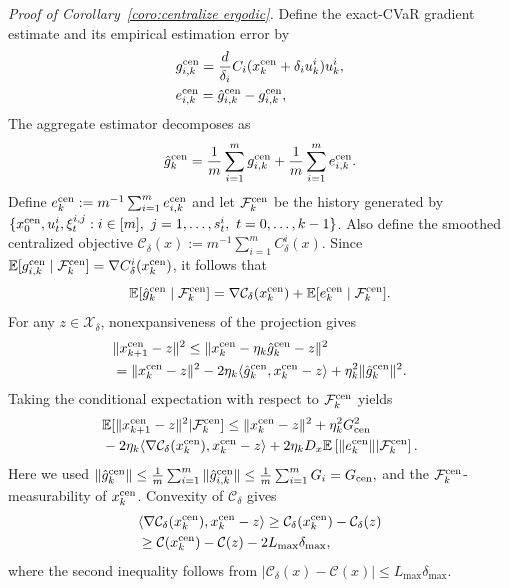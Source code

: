 \documentclass[twocolumn]{autart}    %
\newcommand{\brk}[1]{\left[#1\right]}
\newcommand{\1}{\mathbf{1}}
\begin{document}
\textit{Proof of Corollary~\ref{coro:centralize ergodic}.}
Define the exact-CVaR gradient estimate and its empirical estimation error by
\begin{align*}
&g_{i,k}^{\rm cen} = \frac{d}{\delta_{i}} C_{i}(x_k^{\rm cen} + \delta_{i} u_{k}^{i}) u_{k}^{i}, \nonumber \\ 
&e_{i,k}^{\rm cen} = \hat{g}_{i,k}^{\rm cen} - g_{i,k}^{\rm cen},
\end{align*}
The aggregate estimator decomposes as
$$\hat{g}_k^{\rm cen} = \frac{1}{m} \sum_{i=1}^{m} g_{i,k}^{\rm cen} + \frac{1}{m} \sum_{i=1}^{m} e_{i,k}^{\rm cen}.$$ 
Define $e_k^{\rm cen}:=m^{-1}\sum_{i=1}^m e_{i,k}^{\rm cen}$ and let $\mathcal F_k^{\rm cen}$ be the history generated by $\{x_0^{\rm cen},u_t^i,\xi_t^{i,j}:i\in[m],\ j=1,\ldots,s_t^i,\ t=0,\ldots,k-1\}$. Also define the smoothed centralized objective $\mathcal C_\delta(x):=m^{-1}\sum_{i=1}^mC_\delta^i(x)$.
Since
$\mathbb{E}[g_{i,k}^{\rm cen} \mid \mathcal{F}_{k}^{\rm cen}] = \nabla C_\delta^i(x_k^{\rm cen})$, it follows that
\begin{equation*}
\mathbb{E}[\hat{g}_k^{\rm cen} \mid \mathcal{F}_{k}^{\rm cen}] = \nabla \mathcal{C}_\delta(x_k^{\rm cen}) + \mathbb{E}[e_k^{\rm cen} \mid \mathcal{F}_{k}^{\rm cen}]   .
\end{equation*}
For any $z\in\mathcal X_\delta$, nonexpansiveness of the projection gives
\begin{align*}
&\|x_{k+1}^{\rm cen} - z\|^{2} \le \|x_k^{\rm cen} - \eta_{k} \hat{g}_k^{\rm cen} - z\|^{2} \\ 
&= \|x_k^{\rm cen} - z\|^{2} - 2\eta_{k} \langle \hat{g}_k^{\rm cen}, x_k^{\rm cen} - z \rangle + \eta_{k}^{2} \|\hat{g}_k^{\rm cen}\|^{2} .
\end{align*} 
Taking the conditional expectation with respect to $\mathcal F_k^{\rm cen}$ yields
\begin{align}\label{eq:centralize one-step}
&\mathbb{E}[\|x_{k+1}^{\rm cen} - z\|^{2} | \mathcal{F}_{k}^{\rm cen}] \le \|x_k^{\rm cen} - z\|^{2}  + \eta_{k}^{2} G_{\text{cen}}^{2} \nonumber \\ 
&- 2\eta_{k} \langle \nabla \mathcal{C}_\delta(x_k^{\rm cen}), x_k^{\rm cen} - z \rangle+ 2\eta_{k} D_{x}  \mathbb{E}\brk{\|e_k^{\rm cen}\|  |\mathcal{F}_{k}^{\rm cen}}. 
\end{align}
 Here we used 
$\|\hat{g}_{k}^{\rm cen}\| \le \frac{1}{m}\sum_{i=1}^m \|\hat{g}_{i,k}^{\rm cen}\| \le  \frac{1}{m}\sum_{i=1}^m  G_{i} = G_{\rm cen},$
and the $\mathcal F_k^{\rm cen}$-measurability of $x_k^{\rm cen}$.
Convexity of $\mathcal C_\delta$ gives
\begin{align}\label{eq:centralize CVaR deviation}
&\langle \nabla \mathcal{C}_\delta(x_k^{\rm cen}), x_k^{\rm cen} - z \rangle \ge \mathcal{C}_\delta(x_k^{\rm cen}) - \mathcal{C}_\delta(z) \nonumber \\ 
& \ge \mathcal{C}(x_k^{\rm cen}) - \mathcal{C}(z) - 2L_{\max} \delta_{\max},
\end{align}
where the second inequality follows from $|\mathcal{C}_\delta(x) - \mathcal{C}(x)| \le L_{\max} \delta_{\max}$.
\end{document}

